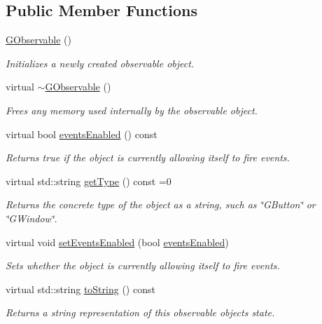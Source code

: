 \subsection*{Public Member Functions}
\begin{DoxyCompactItemize}
\item 
\mbox{\hyperlink{classsgl_1_1GObservable_aa083d318cdd2a045471445fbbd26b919}{G\+Observable}} ()
\begin{DoxyCompactList}\small\item\em Initializes a newly created observable object. \end{DoxyCompactList}\item 
virtual \mbox{\hyperlink{classsgl_1_1GObservable_a755e7879db8b0a71916cfde365d49305}{$\sim$\+G\+Observable}} ()
\begin{DoxyCompactList}\small\item\em Frees any memory used internally by the observable object. \end{DoxyCompactList}\item 
virtual bool \mbox{\hyperlink{classsgl_1_1GObservable_a8ebb3da91032e7f4c34485dabc518b8a}{events\+Enabled}} () const
\begin{DoxyCompactList}\small\item\em Returns true if the object is currently allowing itself to fire events. \end{DoxyCompactList}\item 
virtual std\+::string \mbox{\hyperlink{classsgl_1_1GObservable_a799e073a127b428cc841086d42ea4fed}{get\+Type}} () const =0
\begin{DoxyCompactList}\small\item\em Returns the concrete type of the object as a string, such as {\ttfamily \char`\"{}\+G\+Button\char`\"{}} or {\ttfamily \char`\"{}\+G\+Window\char`\"{}}. \end{DoxyCompactList}\item 
virtual void \mbox{\hyperlink{classsgl_1_1GObservable_afaa30b2a9e0f378fd1c70d2f1d0b8216}{set\+Events\+Enabled}} (bool \mbox{\hyperlink{classsgl_1_1GObservable_a8ebb3da91032e7f4c34485dabc518b8a}{events\+Enabled}})
\begin{DoxyCompactList}\small\item\em Sets whether the object is currently allowing itself to fire events. \end{DoxyCompactList}\item 
virtual std\+::string \mbox{\hyperlink{classsgl_1_1GObservable_a1fe5121d6528fdea3f243321b3fa3a49}{to\+String}} () const
\begin{DoxyCompactList}\small\item\em Returns a string representation of this observable object\textquotesingle{}s state. \end{DoxyCompactList}\end{DoxyCompactItemize}
